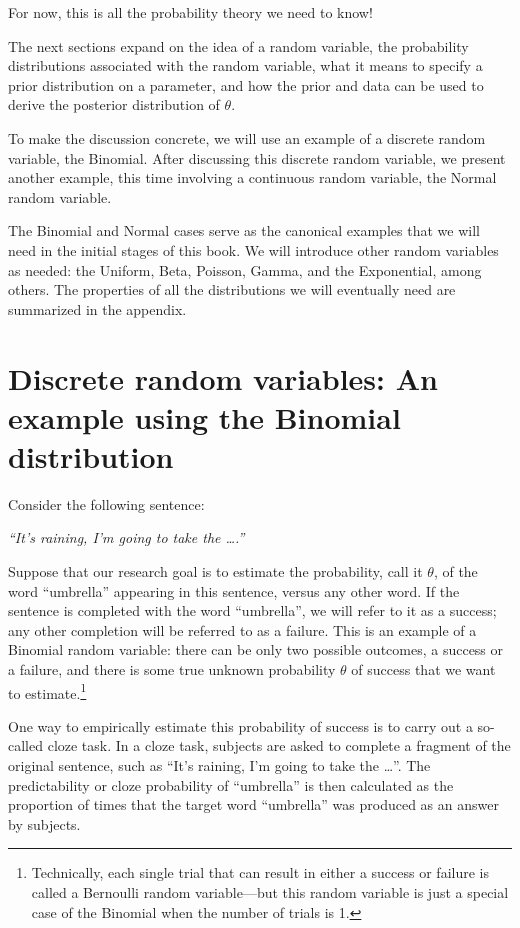 \documentclass[12pt,]{krantz}
\theoremstyle{definition}
\theoremstyle{definition}
\theoremstyle{definition}
\theoremstyle{remark}
\begin{document}
For now, this is all the probability theory we need to know!

The next sections expand on the idea of a random variable, the
probability distributions associated with the random variable, what it
means to specify a prior distribution on a parameter, and how the prior
and data can be used to derive the posterior distribution of \(\theta\).

To make the discussion concrete, we will use an example of a discrete
random variable, the Binomial. After discussing this discrete random
variable, we present another example, this time involving a continuous
random variable, the Normal random variable.

The Binomial and Normal cases serve as the canonical examples that we
will need in the initial stages of this book. We will introduce other
random variables as needed: the Uniform, Beta, Poisson, Gamma, and the
Exponential, among others. The properties of all the distributions we
will eventually need are summarized in the appendix.

\section{Discrete random variables: An example using the Binomial
distribution}\label{sec:binomialcloze}

Consider the following sentence:

\emph{``It's raining, I'm going to take the \ldots{}.''}

Suppose that our research goal is to estimate the probability, call it
\(\theta\), of the word ``umbrella'' appearing in this sentence, versus
any other word. If the sentence is completed with the word ``umbrella'',
we will refer to it as a success; any other completion will be referred
to as a failure. This is an example of a Binomial random variable: there
can be only two possible outcomes, a success or a failure, and there is
some true unknown probability \(\theta\) of success that we want to
estimate.\footnote{Technically, each single trial that can result in
  either a success or failure is called a Bernoulli random
  variable---but this random variable is just a special case of the
  Binomial when the number of trials is 1.}

One way to empirically estimate this probability of success is to carry
out a so-called cloze task. In a cloze task, subjects are asked to
complete a fragment of the original sentence, such as ``It's raining,
I'm going to take the \ldots{}''. The predictability or cloze
probability of ``umbrella'' is then calculated as the proportion of
times that the target word ``umbrella'' was produced as an answer by
subjects.
\end{document}
